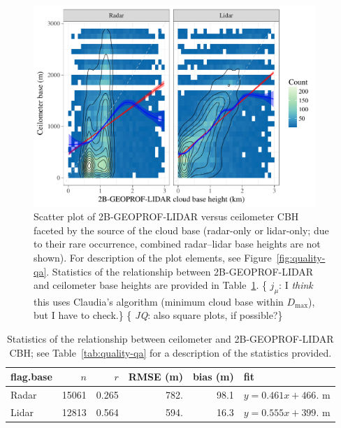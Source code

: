 \documentclass[essd,manuscript]{copernicus}\usepackage[]{graphicx}\usepackage[]{color}
\newcommand{\hlnum}[1]{\textcolor[rgb]{0.686,0.059,0.569}{#1}}%
\newenvironment{knitrout}{}{} %
\newcommand\comment[2]{\{\hlnum{ \textit{#1}: #2}\}}
\newcommand\commentjm[1]{\comment{$j_\mu$}{#1}}
\begin{document}
\begin{figure}
  \centering

\begin{knitrout}
\color{fgcolor}

{\centering \includegraphics[width=0.95\textwidth]{figure/method-eval-2bgeoprof-1} 

}



\end{knitrout}
  \caption{Scatter plot of 2B-GEOPROF-LIDAR versus ceilometer CBH
    faceted by the source of the cloud base (radar-only or lidar-only; due to
    their rare occurrence, combined radar--lidar base heights are not shown).
    For description of the plot elements, see Figure~\ref{fig:quality-qa}.  Statistics of the
    relationship between 2B-GEOPROF-LIDAR and ceilometer base heights are provided in
    Table~\ref{tab:2bgeoprof}.
    \commentjm{I \textit{think} this uses Claudia's algorithm (minimum cloud
      base within $D_\text{max}$), but I have to check.} \comment{JQ}{also square
  plots, if possible?}}
  \label{fig:eval-2b}
\end{figure}

\begin{table}
  \caption{Statistics of the relationship between ceilometer and
    2B-GEOPROF-LIDAR CBH; see Table~\ref{tab:quality-qa} for a
    description of the statistics provided.}
  \label{tab:2bgeoprof}
  \centering
\begin{tabular}{lrrrrl}
  \hline
\hline
flag.base & $n$ & $r$ & RMSE (m) & bias (m) & fit \\ 
  \hline
Radar & 15061 & 0.265 & 782. & 98.1 & $y = 0.461 x + 466.$ m \\ 
  Lidar & 12813 & 0.564 & 594. & 16.3 & $y = 0.555 x + 399.$ m \\ 
   \hline
\hline
\end{tabular}

\end{table}
\end{document}
